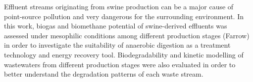 Effluent streams originating from swine production can be a major cause of point-source pollution and very dangerous for the surrounding environment. In this work, biogas and biomethane potential of swine-derived effluents was assessed under mesophilic conditions among different production stages (Farrow) in order to investigate the suitability of anaerobic digestion as a treatment technology and energy recovery tool. Biodegradability and kinetic modelling of wastewaters from different production stages were also evaluated in order to better understand the degradation patterns of each waste stream.
